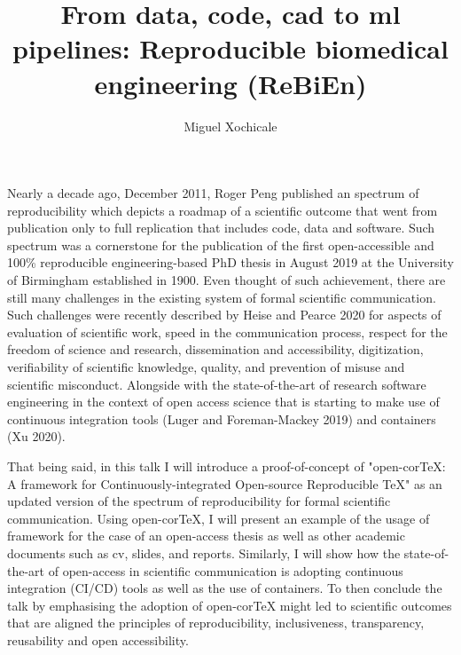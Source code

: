 \documentclass[11pt]{article}
\title{
From data, code, cad to ml pipelines: Reproducible biomedical engineering (ReBiEn)
}
\author{Miguel Xochicale}
\date{\DTMNow}
\begin{document}
\maketitle
Nearly a decade ago, December 2011, Roger Peng published an spectrum of reproducibility 
which depicts a roadmap of a scientific outcome
that went from publication only to full replication that includes code, data and software.
Such spectrum was a cornerstone for 
the publication of the first open-accessible 
and 100\% reproducible engineering-based PhD thesis in August 2019 
at the University of Birmingham established in 1900.
Even thought of such achievement, there are still many challenges in the existing system 
of formal scientific communication.
Such challenges were recently described by Heise and Pearce 2020
for aspects of evaluation of scientific work, 
speed in the communication process,
respect for the freedom of science and research,
dissemination and accessibility, digitization,
verifiability of scientific knowledge, quality, 
and prevention of misuse and scientific misconduct.
Alongside with the state-of-the-art of research software engineering
in the context of open access science that is starting to make use 
of continuous integration tools 
(Luger and Foreman-Mackey 2019) and 
containers (Xu 2020).

That being said, in this talk I will introduce a proof-of-concept of 
"open-corTeX: A framework for Continuously-integrated Open-source Reproducible TeX" 
as an updated version of the spectrum of reproducibility for 
formal scientific communication.
Using open-corTeX, I will present an example of the usage of framework 
for the case of an open-access thesis 
as well as other academic documents such as cv, slides, and reports. 
Similarly, I will show how the state-of-the-art of open-access in scientific 
communication is adopting continuous integration (CI/CD) tools
as well as the use of containers.
To then conclude the talk by emphasising 
the adoption of open-corTeX might led to scientific outcomes 
that are aligned the principles of 
reproducibility, inclusiveness, transparency,
reusability  and open accessibility.

\end{document}
